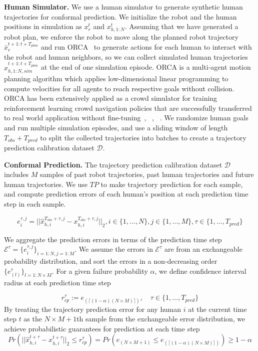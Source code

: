 \textbf{Human Simulator.} We use a human simulator to generate synthetic human trajectories for conformal prediction. We initialize the robot and the human positions in simulation as $x_r^{t}$ and $x_{h,1:N}^{t}$. Assuming that we have generated a robot plan, we enforce the robot to move along the planned robot trajectory $\bar{x}_{r}^{t+1:t+T_{plan}}$ and run ORCA~\cite{van2011reciprocal} to generate actions for each human to interact with the robot and human neighbors, so we can collect simulated human trajectories $x_{h, 1:N, sim}^{t+1:t+T_{plan}}$ at the end of one simulation episode. ORCA is a multi-agent motion planning algorithm which applies low-dimensional linear programming to compute velocities for all agents to reach respective goals without collision. ORCA has been extensively applied as a crowd simulator for training reinforcement learning crowd navigation policies that are successfully transferred to real world application without fine-tuning~\cite{chen2019crowd}, ~\cite{liu2021decentralized}, ~\cite{liu2023intention}. We randomize human goals and run multiple simulation episodes, and use a sliding window of length $T_{obs}+T_{pred}$ to split the collected trajectories into batches to create a trajectory prediction calibration dataset $\mathcal{D}$.

\textbf{Conformal Prediction.} The trajectory prediction calibration dataset $\mathcal{D}$ includes $M$ samples of past robot trajectories, past human trajectories and future human trajectories. We use $TP$ to make trajectory prediction for each sample, and compute prediction errors of each human's position at each prediction time step in each sample.

\begin{equation}
    e_{i}^{\tau, j} = ||\hat{x}_{h,i}^{T_{obs}+\tau, j} - x_{h,i}^{T_{obs}+\tau, j}||_2, i\!\in\!\{1, \ldots, N\}, j\!\in\!\{1, \ldots, M\}, \tau\!\in\!\{1, \ldots, T_{pred}\}
\end{equation}

We aggregate the prediction errors in terms of the prediction time step $\mathcal{E}^\tau = \{e_{i}^{\tau, j}\}_{i=1:N,j=1:M}$. We assume the errors in $\mathcal{E}^\tau$ are from an exchangeable probability distribution, and sort the errors in a non-decreasing order $\{{e}_{(l)}^{\tau}\}_{l=1:N\times M}$. For a given failure probability $\alpha$, we define confidence interval radius at each prediction time step

\begin{equation}
r_{cp}^{\tau} := {e}_{(\lceil(1-\alpha)(N\times M)\rceil)}, \quad \tau\!\in\!\{1, \ldots, T_{pred}\}
\end{equation}
By treating the trajectory prediction error for any human $i$ at the current time step $t$ as the $N\times M+1$th sample from the exchangeable error distribution, we achieve probabilistic guarantees for prediction at each time step
\begin{equation}
Pr\left(||\hat{x}_{h,i}^{t+\tau}-x_{h,i}^{t+\tau}||_2 \leq
r_{cp}^{\tau}\right) = Pr\left({e}_{(N\times M+1)} \leq
{e}_{(\lceil(1-\alpha)(N\times M)\rceil)}\right) \geq 1 - \alpha
\end{equation}


